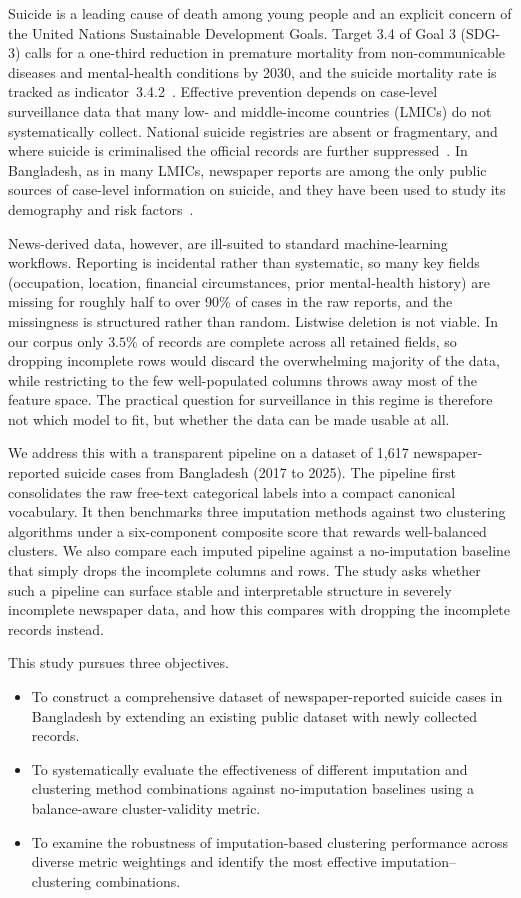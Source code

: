 \documentclass[conference]{IEEEtran}
\begin{document}
Suicide is a leading cause of death among young people and an explicit concern of the United Nations Sustainable Development Goals. Target 3.4 of Goal 3 (SDG-3) calls for a one-third reduction in premature mortality from non-communicable diseases and mental-health conditions by 2030, and the suicide mortality rate is tracked as indicator~3.4.2~\cite{un2015sdg,who2024sdg34}. Effective prevention depends on case-level surveillance data that many low- and middle-income countries (LMICs) do not systematically collect. National suicide registries are absent or fragmentary, and where suicide is criminalised the official records are further suppressed~\cite{arafat2025surveillance}. In Bangladesh, as in many LMICs, newspaper reports are among the only public sources of case-level information on suicide, and they have been used to study its demography and risk factors~\cite{himel2024studentnews}.

News-derived data, however, are ill-suited to standard machine-learning workflows. Reporting is incidental rather than systematic, so many key fields (occupation, location, financial circumstances, prior mental-health history) are missing for roughly half to over 90\% of cases in the raw reports, and the missingness is structured rather than random. Listwise deletion is not viable. In our corpus only $3.5\%$ of records are complete across all retained fields, so dropping incomplete rows would discard the overwhelming majority of the data, while restricting to the few well-populated columns throws away most of the feature space. The practical question for surveillance in this regime is therefore not which model to fit, but whether the data can be made usable at all.

We address this with a transparent pipeline on a dataset of 1{,}617 newspaper-reported suicide cases from Bangladesh (2017 to 2025). The pipeline first consolidates the raw free-text categorical labels into a compact canonical vocabulary. It then benchmarks three imputation methods against two clustering algorithms under a six-component composite score that rewards well-balanced clusters. We also compare each imputed pipeline against a no-imputation baseline that simply drops the incomplete columns and rows. The study asks whether such a pipeline can surface stable and interpretable structure in severely incomplete newspaper data, and how this compares with dropping the incomplete records instead.

This study pursues three objectives.
\begin{itemize}
\item To construct a comprehensive dataset of newspaper-reported suicide cases in Bangladesh by extending an existing public dataset with newly collected records.
\item To systematically evaluate the effectiveness of different imputation and clustering method combinations against no-imputation baselines using a balance-aware cluster-validity metric.
\item To examine the robustness of imputation-based clustering performance across diverse metric weightings and identify the most effective imputation--clustering combinations.
\end{itemize}
\end{document}
